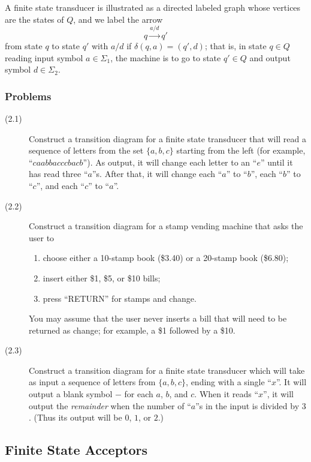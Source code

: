 \documentclass{article}
\begin{document}
A finite state transducer is illustrated as a directed labeled graph whose vertices are the states of $Q$, and we label the arrow
\begin{equation*}
q \overset{a/d}{\longrightarrow} q'
\end{equation*}
from state $q$ to state $q'$ with $a/d$ if $\delta(q,a) = (q',d)$; that is, in state $q \in Q$ reading input symbol $a \in \Sigma_1$, the machine is to go to state $q' \in Q$ and output symbol $d \in \Sigma_2$.


\subsubsection*{Problems}

\begin{description}
  \item[(2.1)] Construct a transition diagram for a finite state transducer that will read a sequence of letters from the set $\{ a,b,c \}$ starting from the left (for example, ``$caabbacccbacb$''). As output, it will change each letter to an ``$e$'' until it has read three ``$a$''s. After that, it will change each ``$a$'' to ``$b$'', each ``$b$'' to ``$c$'', and each ``$c$'' to ``$a$''.
  \item[(2.2)] Construct a transition diagram for a stamp vending machine that asks the user to
    \begin{enumerate}
      \item choose either a 10-stamp book (\$3.40) or a 20-stamp book (\$6.80); 
      \item insert either \$1, \$5, or \$10 bills; 
      \item press ``RETURN'' for stamps and change.
    \end{enumerate}
    You may assume that the user never inserts a bill that will need to be returned as change; for example, a \$1 followed by a \$10.
  \item[(2.3)] Construct a transition diagram for a finite state transducer which will take as input a sequence of letters from $\{ a,b,c \}$, ending with a single ``$x$''. It will output a blank symbol $-$ for each $a$, $b$, and $c$. When it reads ``$x$'', it will output the \emph{remainder} when the number of ``$a$''s in the input is divided by $3$. (Thus its output will be $0$, $1$, or $2$.)
\end{description}


\subsection{Finite State Acceptors} %
\end{document}

